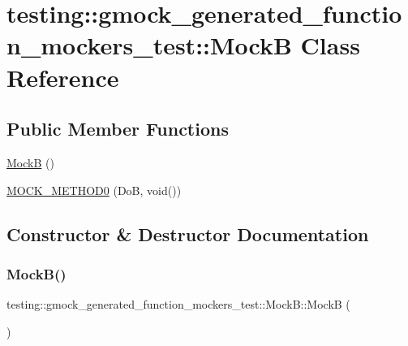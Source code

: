 \hypertarget{classtesting_1_1gmock__generated__function__mockers__test_1_1MockB}{}\section{testing\+::gmock\+\_\+generated\+\_\+function\+\_\+mockers\+\_\+test\+::MockB Class Reference}
\label{classtesting_1_1gmock__generated__function__mockers__test_1_1MockB}
\subsection*{Public Member Functions}
\begin{DoxyCompactItemize}
\item 
\mbox{\hyperlink{classtesting_1_1gmock__generated__function__mockers__test_1_1MockB_a74072ea75eb47e4e91e40151396014a1}{MockB}} ()
\item 
\mbox{\hyperlink{classtesting_1_1gmock__generated__function__mockers__test_1_1MockB_af0a5dcd462fc478e5e7a1ef503aafb05}{M\+O\+C\+K\+\_\+\+M\+E\+T\+H\+O\+D0}} (DoB, void())
\end{DoxyCompactItemize}


\subsection{Constructor \& Destructor Documentation}
\mbox{\label{classtesting_1_1gmock__generated__function__mockers__test_1_1MockB_a74072ea75eb47e4e91e40151396014a1}} 
\subsubsection{\texorpdfstring{MockB()}{MockB()}}
{\footnotesize\ttfamily testing\+::gmock\+\_\+generated\+\_\+function\+\_\+mockers\+\_\+test\+::\+Mock\+B\+::\+MockB (\begin{DoxyParamCaption}{ }\end{DoxyParamCaption})\hspace{0.3cm}{\ttfamily [inline]}}



